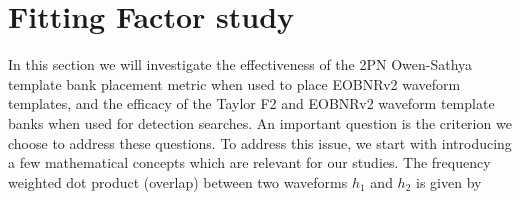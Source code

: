 \documentclass[aps,
prd,
amsmath,
amssymb,
twocolumn,
floatfix,
groupedaddress]{revtex4-1}
\begin{document}
\section{Fitting Factor study}\label{sec:level1:FFStudy}
In this section we will investigate the effectiveness of the 2PN Owen-Sathya template bank placement metric when used to place EOBNRv2 waveform templates, and the efficacy of the Taylor F2 and EOBNRv2 waveform template banks when used for detection searches. An important question is the criterion we choose to address these questions. To address this issue, we start with introducing a few mathematical concepts which are relevant for our studies. The frequency weighted dot product (overlap) between two waveforms $h_1$ and $h_2$ is given by
\end{document}

